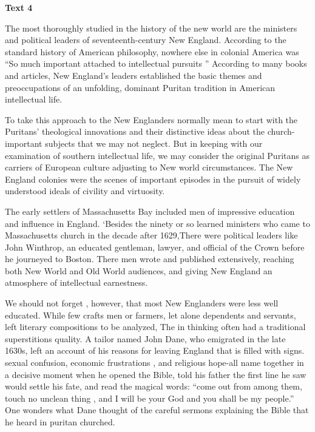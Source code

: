\begin{center}\textbf{Text 4}\end{center}

\qquad The most thoroughly studied in the history of the new world are the ministers and political leaders of seventeenth-century New England. According to the standard history of American philosophy, nowhere else in colonial America was “So much important attached to intellectual pursuits ” According to many books and articles, New England’s leaders established the basic themes and preoccupations of an unfolding, dominant Puritan tradition in American intellectual life.

\qquad To take this approach to the New Englanders normally mean to start with the Puritans’ theological innovations and their distinctive ideas about the church-important subjects that we may not neglect. But in keeping with our examination of southern intellectual life, we may consider the original Puritans as carriers of European culture adjusting to New world circumstances. The New England colonies were the scenes of important episodes in the pursuit of widely understood ideals of civility and virtuosity.

\qquad The early settlers of Massachusetts Bay included men of impressive education and influence in England. `Besides the ninety or so learned ministers who came to Massachusetts church in the decade after 1629,There were political leaders like John Winthrop, an educated gentleman, lawyer, and official of the Crown before he journeyed to Boston. There men wrote and published extensively, reaching both New World and Old World audiences, and giving New England an atmosphere of intellectual earnestness.

\qquad We should not forget , however, that most New Englanders were less well educated. While few crafts men or farmers, let alone dependents and servants, left literary compositions to be analyzed, The in thinking often had a traditional superstitions quality. A tailor named John Dane, who emigrated in the late 1630s, left an account of his reasons for leaving England that is filled with signs. sexual confusion, economic frustrations , and religious hope-all name together in a decisive moment when he opened the Bible, told his father the first line he saw would settle his fate, and read the magical words: “come out from among them, touch no unclean thing , and I will be your God and you shall be my people.” One wonders what Dane thought of the careful sermons explaining the Bible that he heard in puritan churched.

